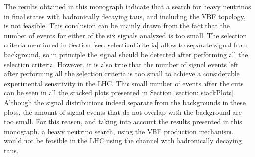 The results obtained in this monograph indicate that a search for heavy neutrinos in final states with hadronically decaying taus, and including the VBF topology, is not feasible. This conclusion can be mainly drawn from the fact that the number of events for either of the six signals analyzed is too small. The selection criteria mentioned in Section \ref{sec: selectionCriteria} allow to separate signal from background, so in principle the signal should be detected after performing all the selection criteria. However, it is also true that the number of signal events left after performing all the selection criteria is too small to achieve a considerable experimental sensitivity in the LHC. This small number of events after the cuts can be seen in all the stacked plots presented in Section \ref{section: stackPlots}. Although the signal distributions indeed separate from the backgrounds in these plots, the amount of signal events that do not overlap with the background are too small. For this reason, and taking into account the results presented in this monograph, a heavy neutrino search, using the VBF production mechanism, would not be feasible in the LHC using the channel with hadronically decaying taus.
